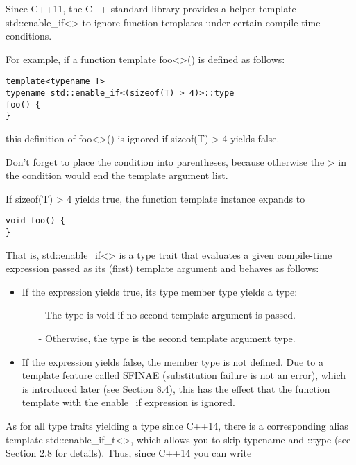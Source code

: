 Since C++11, the C++ standard library provides a helper template std::enable\_if<> to ignore function templates under certain compile-time conditions.

For example, if a function template foo<>() is defined as follows:

\begin{lstlisting}[style=styleCXX]
template<typename T>
typename std::enable_if<(sizeof(T) > 4)>::type
foo() {
}
\end{lstlisting}

this definition of foo<>() is ignored if sizeof(T) > 4 yields false.

\begin{tcolorbox}[colback=webgreen!5!white,colframe=webgreen!75!black]
\hspace*{0.75cm}Don’t forget to place the condition into parentheses, because otherwise the > in the condition would end the template argument list.
\end{tcolorbox}

If sizeof(T) > 4 yields true, the function template instance expands to

\begin{lstlisting}[style=styleCXX]
void foo() {
}
\end{lstlisting}

That is, std::enable\_if<> is a type trait that evaluates a given compile-time expression passed as its (first) template argument and behaves as follows:

\begin{itemize}
\item 
If the expression yields true, its type member type yields a type:

\begin{itemize}
\item[-]
The type is void if no second template argument is passed.
	
\item[-]
Otherwise, the type is the second template argument type.
\end{itemize}

\item 
If the expression yields false, the member type is not defined. Due to a template feature called SFINAE (substitution failure is not an error), which is introduced later (see Section 8.4), this has the effect that the function template with the enable\_if expression is ignored.
\end{itemize}

As for all type traits yielding a type since C++14, there is a corresponding alias template std::enable\_if\_t<>, which allows you to skip typename and ::type (see Section 2.8 for details). Thus, since C++14 you can write


